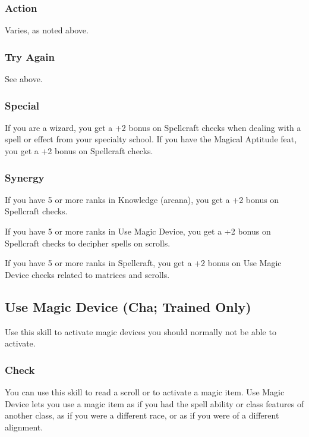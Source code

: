 \subsubsection{Action}
Varies, as noted above.
\subsubsection{Try Again}
See above.
\subsubsection{Special}
If you are a wizard, you get a +2 bonus on Spellcraft checks when dealing with a spell or effect from your specialty school. 
If you have the Magical Aptitude feat, you get a +2 bonus on Spellcraft checks.
\subsubsection{Synergy}
\begin{list}{}{\leftmargin=1em}
 \item If you have 5 or more ranks in Knowledge (arcana), you get a +2 bonus on Spellcraft checks.
 \item If you have 5 or more ranks in Use Magic Device, you get a +2 bonus on Spellcraft checks to decipher spells on scrolls.
 \item If you have 5 or more ranks in Spellcraft, you get a +2 bonus on Use Magic Device checks related to matrices and scrolls.
\end{list}

\subsection[Use Magic Device]{Use Magic Device (Cha; Trained Only)}
\label{sec:UseMagicDevice}
Use this skill to activate magic devices you should normally not be able to activate.
\subsubsection{Check}
You can use this skill to read a scroll or to activate a magic item. Use Magic Device lets you use a magic item as if you had the spell ability or class features of another class, as if you were a different race, or as if you were of a different alignment.

